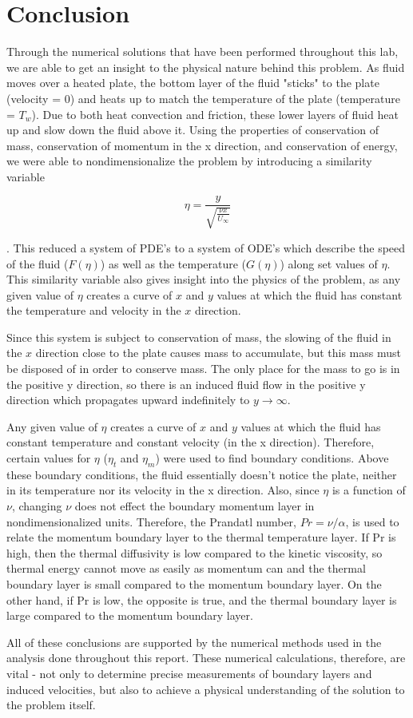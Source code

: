 \documentclass[12pt]{article}\pagestyle{myheadings}
\theoremstyle{plain}
\begin{document}
\section{Conclusion}
Through the numerical solutions that have been performed throughout this lab, we are able to get an insight to the physical nature behind this problem. As fluid moves over a heated plate, the bottom layer of the fluid "sticks" to the plate (velocity = 0) and heats up to match the temperature of the plate (temperature = $T_w$). Due to both heat convection and friction, these lower layers of fluid heat up and slow down the fluid above it. Using the properties of conservation of mass, conservation of momentum in the x direction, and conservation of energy, we were able to nondimensionalize the problem by introducing a similarity variable 

{\[ \eta = \frac{y}{\sqrt{\frac{\nu x}{U_{\infty}}}} \]}

. This reduced a system of PDE's to a system of ODE's which describe the speed of the fluid ($F(\eta)$) as well as the temperature ($G(\eta)$) along set values of $\eta$. This similarity variable also gives insight into the physics of the problem, as any given value of $\eta$ creates a curve of $x$ and $y$ values at which the fluid has constant the temperature and velocity in the $x$ direction.

Since this system is subject to conservation of mass, the slowing of the fluid in the $x$ direction close to the plate causes mass to accumulate, but this mass must be disposed of in order to conserve mass. The only place for the mass to go is in the positive y direction, so there is an induced fluid flow in the positive y direction which propagates upward indefinitely to $y \rightarrow \infty$.

Any given value of $\eta$ creates a curve of $x$ and $y$ values at which the fluid has constant temperature and constant velocity (in the x direction). Therefore, certain values for $\eta$ ($\eta_{t}$ and $\eta_{m}$) were used to find boundary conditions. Above these boundary conditions, the fluid essentially doesn't notice the plate, neither in its temperature nor its velocity in the x direction. Also, since $\eta$ is a function of $\nu$, changing $\nu$ does not effect the boundary momentum layer in nondimensionalized units. Therefore, the Prandatl number, $Pr = \nu / \alpha$, is used to relate the momentum boundary layer to the thermal temperature layer. If Pr is high, then the thermal diffusivity is low compared to the kinetic viscosity, so thermal energy cannot move as easily as momentum can and the thermal boundary layer is small compared to the momentum boundary layer. On the other hand, if Pr is low, the opposite is true, and the thermal boundary layer is large compared to the momentum boundary layer.

All of these conclusions are supported by the numerical methods used in the analysis done throughout this report. These numerical calculations, therefore, are vital - not only to determine precise measurements of boundary layers and induced velocities, but also to achieve a  physical understanding of the solution to the problem itself.
\end{document}
